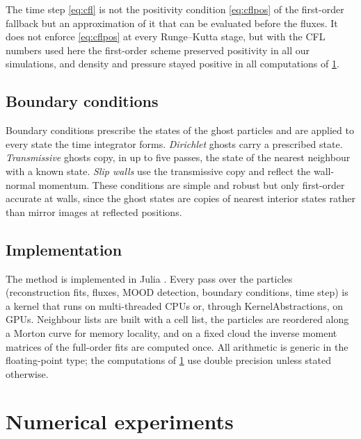\documentclass[smallextended]{svjour3}
\numberwithin{equation}{section}
\begin{document}
The time step \eqref{eq:cfl} is not the positivity condition \eqref{eq:cflpos} of the first-order fallback but an approximation of it that can be evaluated before the fluxes. It does not enforce \eqref{eq:cflpos} at every Runge--Kutta stage, but with the CFL numbers used here the first-order scheme preserved positivity in all our simulations, and density and pressure stayed positive in all computations of \cref{sec:experiments}.

\subsection{Boundary conditions}\label{sec:bc}

Boundary conditions prescribe the states of the ghost particles and are applied to every state the time integrator forms. \emph{Dirichlet} ghosts carry a prescribed state. \emph{Transmissive} ghosts copy, in up to five passes, the state of the nearest neighbour with a known state. \emph{Slip walls} use the transmissive copy and reflect the wall-normal momentum. These conditions are simple and robust but only first-order accurate at walls, since the ghost states are copies of nearest interior states rather than mirror images at reflected positions.

\subsection{Implementation}\label{sec:implementation}

The method is implemented in Julia \cite{jung_hypercloudcore,jung_hypercloud}. Every pass over the particles (reconstruction fits, fluxes, MOOD detection, boundary conditions, time step) is a kernel that runs on multi-threaded CPUs or, through KernelAbstractions, on GPUs. Neighbour lists are built with a cell list, the particles are reordered along a Morton curve for memory locality, and on a fixed cloud the inverse moment matrices of the full-order fits are computed once. All arithmetic is generic in the floating-point type; the computations of \cref{sec:experiments} use double precision unless stated otherwise.

\section{Numerical experiments}\label{sec:experiments}
\end{document}

